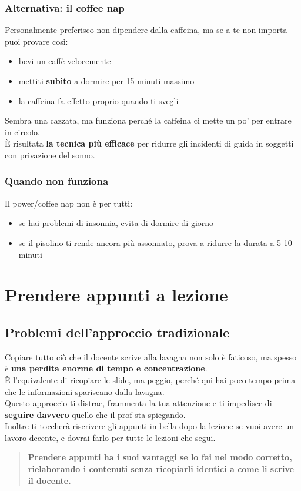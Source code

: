 \documentclass[18pt]{extarticle}
\begin{document}
\subsubsection{Alternativa: il coffee nap}
Personalmente preferisco non dipendere dalla caffeina, ma se a te non importa puoi provare così:
\begin{itemize}
\item bevi un caffè velocemente
\item mettiti \textbf{subito} a dormire per 15 minuti massimo
\item la caffeina fa effetto proprio quando ti svegli
\end{itemize}
Sembra una cazzata, ma funziona perché la caffeina ci mette un po' per entrare in circolo.\\
È risultata \textbf{la tecnica più efficace} per ridurre gli incidenti di guida in soggetti con privazione del sonno.


\subsubsection{Quando non funziona}
Il power/coffee nap non è per tutti:
\begin{itemize}
\item se hai problemi di insonnia, evita di dormire di giorno
\item se il pisolino ti rende ancora più assonnato, prova a ridurre la durata a 5-10 minuti
\end{itemize}


\section{Prendere appunti a lezione}
\subsection{Problemi dell'approccio tradizionale}
Copiare tutto ciò che il docente scrive alla lavagna non solo è faticoso, ma spesso è \textbf{una perdita enorme di tempo e concentrazione}.\\
È l'equivalente di ricopiare le slide, ma peggio, perché qui hai poco tempo prima che le informazioni spariscano dalla lavagna.\\
Questo approccio ti distrae, frammenta la tua attenzione e ti impedisce di \textbf{seguire davvero} quello che il prof sta spiegando.\\
Inoltre ti toccherà riscrivere gli appunti in bella dopo la lezione se vuoi avere un lavoro decente, e dovrai farlo per tutte le lezioni che segui.
\begin{quote}
\textbf{Prendere appunti ha i suoi vantaggi se lo fai nel modo corretto, rielaborando i contenuti senza ricopiarli identici a come li scrive il docente.}
\end{quote}
\end{document}
